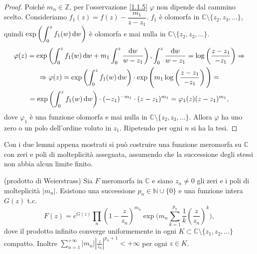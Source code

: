 \begin{proof}
  Poiché $m_n \in \mathbb{Z}$, per l'osservazione \ref{1.1.5} $\varphi$ non dipende dal cammino scelto. Consideriamo $f_1(z)=f(z)-\dfrac{m_1}{z-z_1}$. $f_1$ è olomorfa in $\mathbb{C}\setminus\{z_2,z_3,\dots\}$, quindi $\displaystyle \exp\left(\int_0^z f_1(w)\mathop{}\!\mathrm{d} w\right)$ è olomorfa e mai nulla in $\mathbb{C}\setminus\{z_2,z_3,\dots\}$.
  \begin{gather*}
    \varphi(z)=\exp\left(\int_0^z f_1(w)\mathop{}\!\mathrm{d} w+m_1\int_0^z\frac{\mathop{}\!\mathrm{d} w}{w-z_1}\right), \int_0^z \frac{\mathop{}\!\mathrm{d} w}{w-z_1}=\log\left(\frac{z-z_1}{-z_1}\right) \Rightarrow \\
    \Rightarrow \varphi(z)=\exp\left(\int_0^z f_1(w)\mathop{}\!\mathrm{d} w\right)\cdot\exp\Bigg(m_1\log\left(\frac{z-z_1}{-z_1}\right)\Bigg)= \\
    =\exp\left(\int_0^z f_1(w)\mathop{}\!\mathrm{d} w\right)\cdot(-z_1)^{-m_1}\cdot(z-z_1)^{m_1}=\varphi_1(z)(z-z_1)^{m_1},
  \end{gather*}
  dove $\varphi_1$ è una funzione olomorfa e mai nulla in $\mathbb{C}\setminus\{z_2,z_3,\dots\}$. Allora $\varphi$ ha uno zero o un polo dell'ordine voluto in $z_1$. Ripetendo per ogni $n$ si ha la tesi.
\end{proof}

Con i due lemmi appena mostrati si può costruire una funzione meromorfa su $\mathbb{C}$ con zeri e poli di molteplicità assegnata, assumendo che la successione degli stessi non abbia alcun limite finito.

\begin{thm} \label{wprod}
  (prodotto di Weierstrass) Sia $F$ meromorfa in $\mathbb{C}$ e siano $z_n \not=0$ gli zeri e i poli di molteplicità $|m_n|$. Esistono una successione $p_n \in \mathbb{N}\cup\{0\}$ e una funzione intera $G(z)$ t.c.
  \begin{equation} \label{wprodformula}
    F(z)=e^{G(z)}\prod_n\left(1-\frac{z}{z_n}\right)^{m_n}\exp\Bigg(m_n\sum_{k=1}^{p_n}\frac{1}{k}\left(\frac{z}{z_n}\right)^k\Bigg),
  \end{equation}
  dove il prodotto infinito converge uniformemente in ogni $K\subset \mathbb{C}\setminus\{z_1,z_2,\dots\}$ compatto. Inoltre $\displaystyle \sum_{n=1}^{+\infty} |m_n|\left|\frac{z}{z_n}\right|^{p_n+1}<+\infty$ per ogni $z \in K$.
\end{thm}

